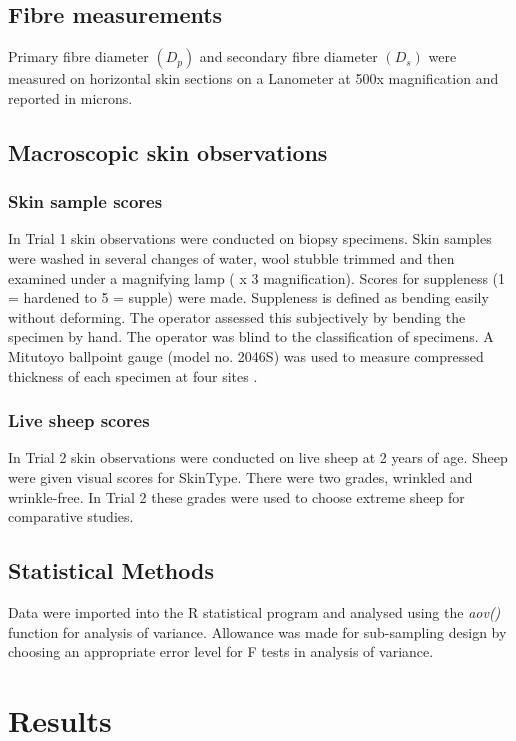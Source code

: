 \documentclass{article}
\begin{document}
\subsection{Fibre measurements}
Primary fibre diameter $(D_{p})$ and secondary fibre diameter $(D_{s})$ were measured on horizontal skin sections on a Lanometer at 500x magnification and reported in microns.

\subsection{Macroscopic skin observations}
\subsubsection{Skin sample scores}
In Trial 1 skin observations were conducted on biopsy specimens.
Skin samples were washed in several changes of water, wool stubble trimmed and then examined under a magnifying lamp ( x 3 magnification).  Scores for  suppleness (1 = hardened to 5 = supple) were made. Suppleness is defined as bending easily without deforming. The operator assessed this subjectively by bending the specimen by hand. The operator was blind to the classification of specimens.  A Mitutoyo ballpoint gauge (model no. 2046S) was used to measure compressed thickness of each specimen at four sites .  

\subsubsection{Live sheep scores}
In Trial 2 skin observations were conducted on live sheep at 2 years of age.
Sheep were given visual scores for SkinType. There were two grades, wrinkled and wrinkle-free. In Trial 2 these grades were used to choose extreme sheep for comparative studies. 

\subsection{Statistical Methods}

Data were imported into the R statistical program \cite{rcoreteam-2017} and analysed using the {\em aov()} function for analysis of variance.
Allowance was made for sub-sampling design by choosing  an appropriate error level for F tests in analysis of variance. 

\section{Results}
\end{document}
